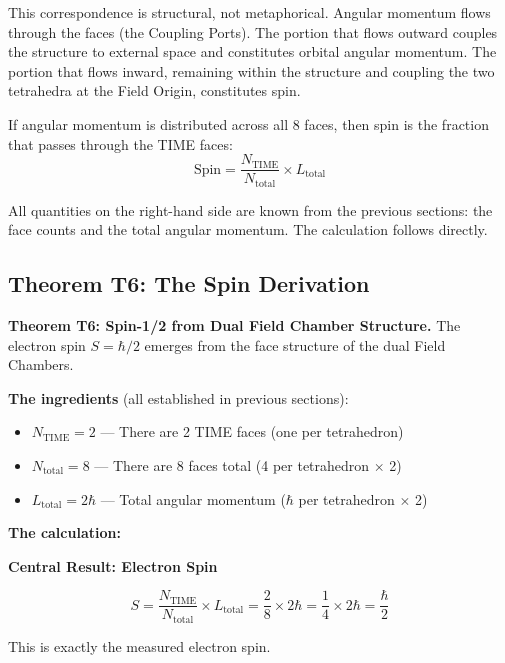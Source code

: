 \documentclass[aps,prd,preprint,superscriptaddress,showpacs,preprintnumbers,amsmath,amssymb,nofootinbib]{revtex4-2}
\begin{document}
This correspondence is structural, not metaphorical. Angular momentum flows through the faces (the Coupling Ports). The portion that flows outward couples the structure to external space and constitutes orbital angular momentum. The portion that flows inward, remaining within the structure and coupling the two tetrahedra at the Field Origin, constitutes spin.

If angular momentum is distributed across all 8 faces, then spin is the fraction that passes through the TIME faces:
\begin{equation}
\text{Spin} = \frac{N_{\text{TIME}}}{N_{\text{total}}} \times L_{\text{total}}
\end{equation}

All quantities on the right-hand side are known from the previous sections: the face counts and the total angular momentum. The calculation follows directly.

\subsection{Theorem T6: The Spin Derivation}
\label{subsec:theorem-t6}

\textbf{Theorem T6: Spin-1/2 from Dual Field Chamber Structure.} The electron spin $S = \hbar/2$ emerges from the face structure of the dual Field Chambers.

\textbf{The ingredients} (all established in previous sections):
\begin{itemize}
\item $N_{\text{TIME}} = 2$ --- There are 2 TIME faces (one per tetrahedron)
\item $N_{\text{total}} = 8$ --- There are 8 faces total (4 per tetrahedron $\times$ 2)
\item $L_{\text{total}} = 2\hbar$ --- Total angular momentum ($\hbar$ per tetrahedron $\times$ 2)
\end{itemize}

\textbf{The calculation:}

\vspace{1.5em}
\noindent
\colorbox{resultgreen}{\parbox{\dimexpr\textwidth-2\fboxsep\relax}{%
\vspace{0.8em}
\centering
\textbf{\large Central Result: Electron Spin}

\vspace{0.5em}
\boldmath
\begin{equation}
S = \frac{N_{\text{TIME}}}{N_{\text{total}}} \times L_{\text{total}} = \frac{2}{8} \times 2\hbar = \frac{1}{4} \times 2\hbar = \frac{\hbar}{2}
\label{eq:spin}
\end{equation}
\unboldmath

\vspace{0.3em}
This is exactly the measured electron spin.
\vspace{0.5em}
}}
\vspace{1cm}
\end{document}

